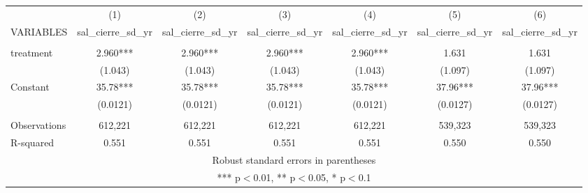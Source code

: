 \documentclass[]{article}
\begin{document}
\begin{tabular}{lcccccc} \hline
 & (1) & (2) & (3) & (4) & (5) & (6) \\
VARIABLES & sal\_cierre\_sd\_yr & sal\_cierre\_sd\_yr & sal\_cierre\_sd\_yr & sal\_cierre\_sd\_yr & sal\_cierre\_sd\_yr & sal\_cierre\_sd\_yr \\ \hline
 &  &  &  &  &  &  \\
treatment & 2.960*** & 2.960*** & 2.960*** & 2.960*** & 1.631 & 1.631 \\
 & (1.043) & (1.043) & (1.043) & (1.043) & (1.097) & (1.097) \\
Constant & 35.78*** & 35.78*** & 35.78*** & 35.78*** & 37.96*** & 37.96*** \\
 & (0.0121) & (0.0121) & (0.0121) & (0.0121) & (0.0127) & (0.0127) \\
 &  &  &  &  &  &  \\
Observations & 612,221 & 612,221 & 612,221 & 612,221 & 539,323 & 539,323 \\
 R-squared & 0.551 & 0.551 & 0.551 & 0.551 & 0.550 & 0.550 \\ \hline
\multicolumn{7}{c}{ Robust standard errors in parentheses} \\
\multicolumn{7}{c}{ *** p$<$0.01, ** p$<$0.05, * p$<$0.1} \\
\end{tabular}
\end{document}
